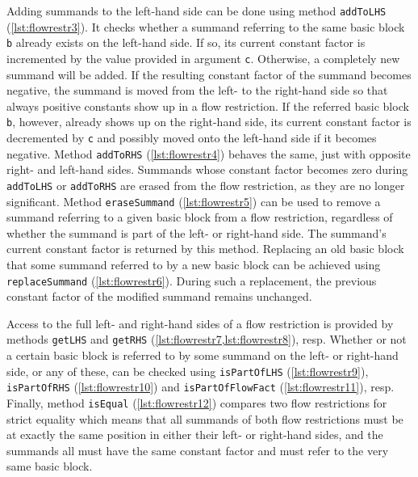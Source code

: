Adding summands to the left-hand side can be done using method \texttt{addToLHS} (\cref{lst:flowrestr3}).
It checks whether a summand referring to the same basic block \texttt{b} already exists on the left-hand side.
If so, its current constant factor is incremented by the value provided in argument \texttt{c}.
Otherwise, a completely new summand will be added.
If the resulting constant factor of the summand becomes negative, the summand is moved from the left- to the right-hand side so that always positive constants show up in a flow restriction.
If the referred basic block \texttt{b}, however, already shows up on the right-hand side, its current constant factor is decremented by \texttt{c} and possibly moved onto the left-hand side if it becomes negative.
Method \texttt{addToRHS} (\cref{lst:flowrestr4}) behaves the same, just with opposite right- and left-hand sides.
Summands whose constant factor becomes zero during \texttt{addToLHS} or \texttt{addToRHS} are erased from the flow restriction, as they are no longer significant.
Method \texttt{eraseSummand} (\cref{lst:flowrestr5}) can be used to remove a summand referring to a given basic block from a flow restriction, regardless of whether the summand is part of the left- or right-hand side.
The summand's current constant factor is returned by this method.
Replacing an old basic block that some summand referred to by a new basic block can be achieved using \texttt{replaceSummand} (\cref{lst:flowrestr6}).
During such a replacement, the previous constant factor of the modified summand remains unchanged.

Access to the full left- and right-hand sides of a flow restriction is provided by methods \texttt{getLHS} and \texttt{getRHS} (\cref{lst:flowrestr7,lst:flowrestr8}), resp.
Whether or not a certain basic block is referred to by some summand on the left- or right-hand side, or any of these, can be checked using \texttt{isPartOfLHS} (\cref{lst:flowrestr9}), \texttt{isPartOfRHS} (\cref{lst:flowrestr10}) and \texttt{isPartOfFlowFact} (\cref{lst:flowrestr11}), resp.
Finally, method \texttt{isEqual} (\cref{lst:flowrestr12}) compares two flow restrictions for strict equality which means that all summands of both flow restrictions must be at exactly the same position in either their left- or right-hand sides, and the summands all must have the same constant factor and must refer to the very same basic block.

